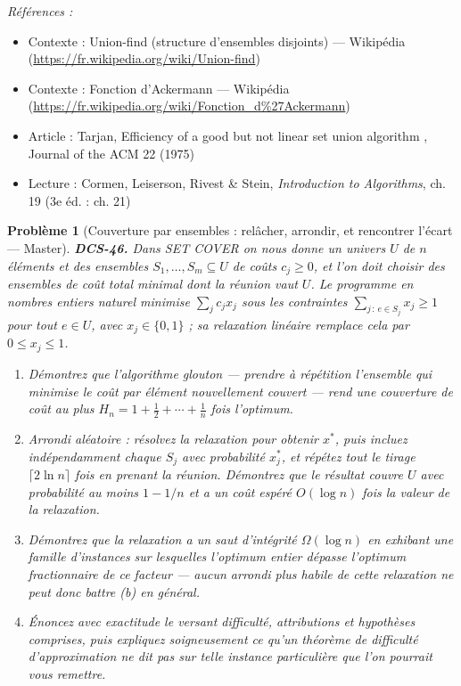 \documentclass[11pt]{article}
\newtheorem{problem}{Problème}
\newenvironment{refs}{\par\small\noindent\emph{Références :}\begin{itemize}\setlength\itemsep{0pt}}{\end{itemize}\normalsize}
\begin{document}
\begin{refs}
\item Contexte : Union-find (structure d'ensembles disjoints) --- Wikipédia (\url{https://fr.wikipedia.org/wiki/Union-find})
\item Contexte : Fonction d'Ackermann --- Wikipédia (\url{https://fr.wikipedia.org/wiki/Fonction_d%27Ackermann})
\item Article : Tarjan, \og{} Efficiency of a good but not linear set union algorithm \fg{}, Journal of the ACM 22 (1975)
\item Lecture : Cormen, Leiserson, Rivest \& Stein, \textit{Introduction to Algorithms}, ch. 19 (3e éd. : ch. 21)
\end{refs}

\bigskip

\begin{problem}[{Couverture par ensembles : relâcher, arrondir, et rencontrer l'écart --- Master}]
\textbf{DCS-46.} Dans SET COVER on nous donne un univers $ U $ de $ n $ éléments et des ensembles $ S_1, \dots, S_m \subseteq U $ de coûts $ c_j \ge 0 $, et l'on doit choisir des ensembles de coût total minimal dont la réunion vaut $ U $. Le programme en nombres entiers naturel minimise $ \sum_j c_j x_j $ sous les contraintes $ \sum_{j\,:\,e \in S_j} x_j \ge 1 $ pour tout $ e \in U $, avec $ x_j \in \{0,1\} $ ; sa relaxation linéaire remplace cela par $ 0 \le x_j \le 1 $.
\begin{enumerate}
\item[(a)] Démontrez que l'algorithme glouton --- prendre à répétition l'ensemble qui minimise le coût par élément nouvellement couvert --- rend une couverture de coût au plus $ H_n = 1 + \frac{1}{2} + \cdots + \frac{1}{n} $ fois l'optimum.
\item[(b)] Arrondi aléatoire : résolvez la relaxation pour obtenir $ x^{*} $, puis incluez indépendamment chaque $ S_j $ avec probabilité $ x^{*}_j $, et répétez tout le tirage $ \lceil 2\ln n \rceil $ fois en prenant la réunion. Démontrez que le résultat couvre $ U $ avec probabilité au moins $ 1 - 1/n $ et a un coût espéré $ O(\log n) $ fois la valeur de la relaxation.
\item[(c)] Démontrez que la relaxation a un saut d'intégrité $ \Omega(\log n) $ en exhibant une famille d'instances sur lesquelles l'optimum entier dépasse l'optimum fractionnaire de ce facteur --- aucun arrondi plus habile de \textit{cette} relaxation ne peut donc battre (b) en général.
\item[(d)] Énoncez avec exactitude le versant difficulté, attributions et hypothèses comprises, puis expliquez soigneusement ce qu'un théorème de difficulté d'approximation ne dit \textit{pas} sur telle instance particulière que l'on pourrait vous remettre.
\end{enumerate}

\end{problem}
\end{document}
